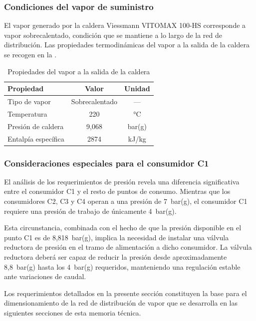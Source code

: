 \subsubsection{Condiciones del vapor de suministro}

El vapor generado por la caldera Viessmann VITOMAX 100-HS corresponde a vapor sobrecalentado, condición que se mantiene a lo largo de la red de distribución. Las propiedades termodinámicas del vapor a la salida de la caldera se recogen en la .

\begin{table}[H]
	\centering
	\caption{Propiedades del vapor a la salida de la caldera}
	\label{tab:condiciones-vapor}
	\begin{tabular}{lcc}
		\toprule
		\textbf{Propiedad}  & \textbf{Valor} & \textbf{Unidad} \\
		\midrule
		Tipo de vapor       & Sobrecalentado & ---             \\
		Temperatura         & 220            & °C              \\
		Presión de caldera  & 9,068          & bar(g)          \\
		Entalpía específica & 2874           & kJ/kg           \\
		\bottomrule
	\end{tabular}
\end{table}

\subsubsection{Consideraciones especiales para el consumidor C1}

El análisis de los requerimientos de presión revela una diferencia significativa entre el consumidor C1 y el resto de puntos de consumo. Mientras que los consumidores C2, C3 y C4 operan a una presión de 7~bar(g), el consumidor C1 requiere una presión de trabajo de únicamente 4~bar(g).

Esta circunstancia, combinada con el hecho de que la presión disponible en el punto C1 es de 8,818~bar(g), implica la necesidad de instalar una válvula reductora de presión en el tramo de alimentación a dicho consumidor. La válvula reductora deberá ser capaz de reducir la presión desde aproximadamente 8,8~bar(g) hasta los 4~bar(g) requeridos, manteniendo una regulación estable ante variaciones de caudal.

Los requerimientos detallados en la presente sección constituyen la base para el dimensionamiento de la red de distribución de vapor que se desarrolla en las siguientes secciones de esta memoria técnica.

